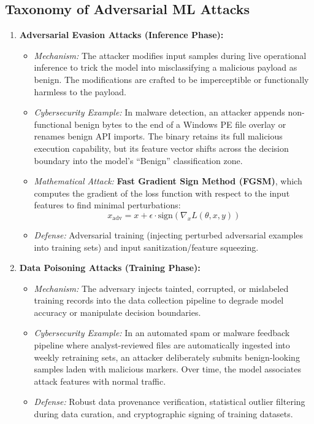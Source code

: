 \subsection{Taxonomy of Adversarial ML Attacks}

\begin{enumerate}
\item \textbf{Adversarial Evasion Attacks (Inference Phase):}
\begin{itemize}
\item \textit{Mechanism:} The attacker modifies input samples during live operational inference to trick the model into misclassifying a malicious payload as benign. The modifications are crafted to be imperceptible or functionally harmless to the payload.
\item \textit{Cybersecurity Example:} In malware detection, an attacker appends non-functional benign bytes to the end of a Windows PE file overlay or renames benign API imports. The binary retains its full malicious execution capability, but its feature vector shifts across the decision boundary into the model's ``Benign'' classification zone.
\item \textit{Mathematical Attack:} \textbf{Fast Gradient Sign Method (FGSM)}, which computes the gradient of the loss function with respect to the input features to find minimal perturbations:
\[ x_{\text{adv}} = x + \epsilon \cdot \text{sign}\left( \nabla_x L(\theta, x, y) \right) \]
\item \textit{Defense:} Adversarial training (injecting perturbed adversarial examples into training sets) and input sanitization/feature squeezing.
\end{itemize}

\item \textbf{Data Poisoning Attacks (Training Phase):}
\begin{itemize}
\item \textit{Mechanism:} The adversary injects tainted, corrupted, or mislabeled training records into the data collection pipeline to degrade model accuracy or manipulate decision boundaries.
\item \textit{Cybersecurity Example:} In an automated spam or malware feedback pipeline where analyst-reviewed files are automatically ingested into weekly retraining sets, an attacker deliberately submits benign-looking samples laden with malicious markers. Over time, the model associates attack features with normal traffic.
\item \textit{Defense:} Robust data provenance verification, statistical outlier filtering during data curation, and cryptographic signing of training datasets.
\end{itemize}


\end{enumerate}
